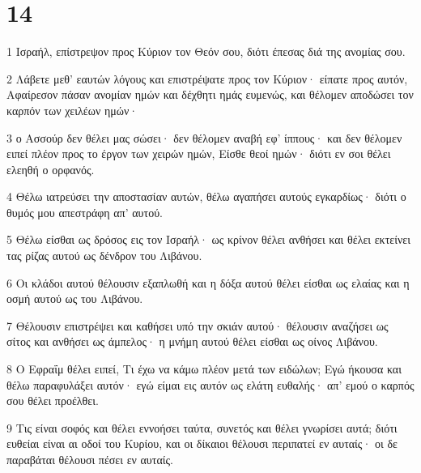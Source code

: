 \chapter{14}

\par 1 Ισραήλ, επίστρεψον προς Κύριον τον Θεόν σου, διότι έπεσας διά της ανομίας σου.
\par 2 Λάβετε μεθ' εαυτών λόγους και επιστρέψατε προς τον Κύριον· είπατε προς αυτόν, Αφαίρεσον πάσαν ανομίαν ημών και δέχθητι ημάς ευμενώς, και θέλομεν αποδώσει τον καρπόν των χειλέων ημών·
\par 3 ο Ασσούρ δεν θέλει μας σώσει· δεν θέλομεν αναβή εφ' ίππους· και δεν θέλομεν ειπεί πλέον προς το έργον των χειρών ημών, Είσθε θεοί ημών· διότι εν σοι θέλει ελεηθή ο ορφανός.
\par 4 Θέλω ιατρεύσει την αποστασίαν αυτών, θέλω αγαπήσει αυτούς εγκαρδίως· διότι ο θυμός μου απεστράφη απ' αυτού.
\par 5 Θέλω είσθαι ως δρόσος εις τον Ισραήλ· ως κρίνον θέλει ανθήσει και θέλει εκτείνει τας ρίζας αυτού ως δένδρον του Λιβάνου.
\par 6 Οι κλάδοι αυτού θέλουσιν εξαπλωθή και η δόξα αυτού θέλει είσθαι ως ελαίας και η οσμή αυτού ως του Λιβάνου.
\par 7 Θέλουσιν επιστρέψει και καθήσει υπό την σκιάν αυτού· θέλουσιν αναζήσει ως σίτος και ανθήσει ως άμπελος· η μνήμη αυτού θέλει είσθαι ως οίνος Λιβάνου.
\par 8 Ο Εφραΐμ θέλει ειπεί, Τι έχω να κάμω πλέον μετά των ειδώλων; Εγώ ήκουσα και θέλω παραφυλάξει αυτόν· εγώ είμαι εις αυτόν ως ελάτη ευθαλής· απ' εμού ο καρπός σου θέλει προέλθει.
\par 9 Τις είναι σοφός και θέλει εννοήσει ταύτα, συνετός και θέλει γνωρίσει αυτά; διότι ευθείαι είναι αι οδοί του Κυρίου, και οι δίκαιοι θέλουσι περιπατεί εν αυταίς· οι δε παραβάται θέλουσι πέσει εν αυταίς.


